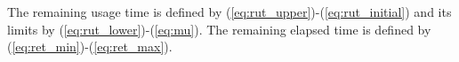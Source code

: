 \documentclass[a4paper,onecolumn,fleqn]{article}
\begin{document}
                

    The remaining usage time is defined by (\ref{eq:rut_upper})-(\ref{eq:rut_initial}) and its limits by (\ref{eq:rut_lower})-(\ref{eq:mu}). 
    The remaining elapsed time is defined by (\ref{eq:ret_min})-(\ref{eq:ret_max}).

\end{document}

